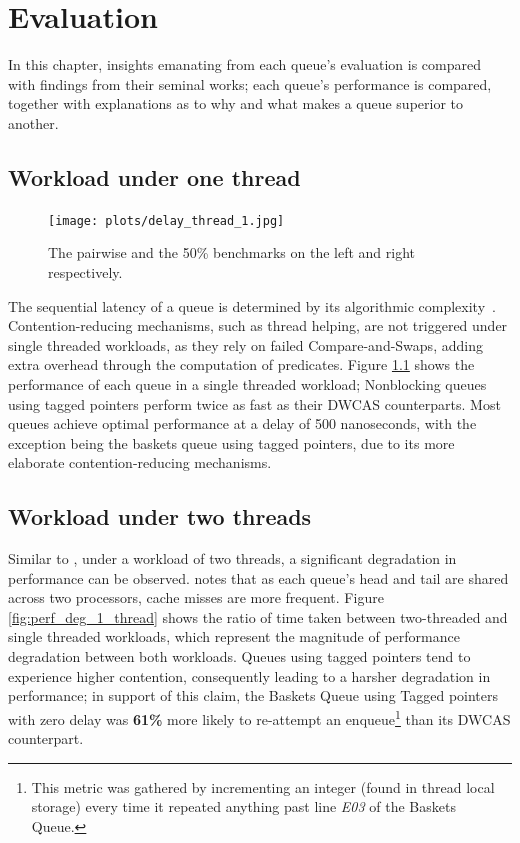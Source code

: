 \chapter{Evaluation}
In this chapter, insights emanating from each queue's evaluation is compared
with findings from their seminal works; each queue's performance is compared, 
together with explanations as to why and what makes a queue superior to another.

\section{Workload under one thread}

\begin{figure}[!ht]
    \texttt{[image: plots/delay\_thread\_1.jpg]}
    \caption{The pairwise and the 50\% benchmarks on the left and right respectively.}
    \label{fig:perf_1_thread}
\end{figure}

The sequential latency of a queue is determined by its algorithmic
complexity~\citep{valois1995datastructures}. Contention-reducing mechanisms,
such as thread helping, are not triggered under single threaded workloads, as
they rely on failed Compare-and-Swaps, adding extra overhead through the
computation of predicates. Figure \ref{fig:perf_1_thread} shows the performance
of each queue in a single threaded workload; Nonblocking queues using
tagged pointers perform twice as fast as their DWCAS counterparts.  
Most queues achieve optimal performance at a delay of 500 nanoseconds, with
the exception being the baskets queue using tagged pointers, due to its more
elaborate contention-reducing mechanisms.

\section{Workload under two threads}
Similar to \citep{michael1996simple,hoffman2007baskets,ladan2008optimistic},
under a workload of two threads, a significant degradation in performance can
be observed. \citeauthor{michael1996simple} notes that as each queue's head and
tail are shared across two processors, cache misses are more frequent. Figure
\ref{fig:perf_deg_1_thread} shows the ratio of time taken between two-threaded
and single threaded workloads, which represent the magnitude of performance
degradation between both workloads. Queues using tagged pointers tend to
experience higher contention, consequently leading to a harsher degradation in
performance; in support of this claim, the Baskets Queue using Tagged pointers
with zero delay was \textbf{61\%} more likely to re-attempt an enqueue\footnote{This metric was gathered by
incrementing an integer (found in thread local storage) every time it repeated
anything past line \emph{E03} of the Baskets Queue.} than its DWCAS counterpart.

